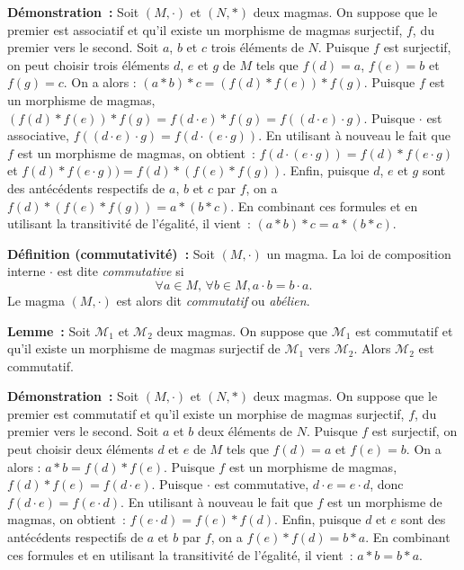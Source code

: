 \medskip

\noindent\textbf{Démonstration :} Soit $(M,\cdot)$ et $(N,\ast)$ deux magmas. 
    On suppose que le premier est associatif et qu'il existe un morphisme de magmas surjectif, $f$, du premier vers le second. 
    Soit $a$, $b$ et $c$ trois éléments de $N$. 
    Puisque $f$ est surjectif, on peut choisir trois éléments $d$, $e$ et $g$ de $M$ tels que $f(d) = a$, $f(e) = b$ et $f(g) = c$.
    On a alors : $(a \ast b) \ast c = (f(d) \ast f(e)) \ast f(g)$.
    Puisque $f$ est un morphisme de magmas, $(f(d) \ast f(e)) \ast f(g) = f(d \cdot e) \ast f(g) = f((d \cdot e) \cdot g)$.
    Puisque $\cdot$ est associative, $f((d \cdot e) \cdot g) = f(d \cdot (e \cdot g))$. 
    En utilisant à nouveau le fait que $f$ est un morphisme de magmas, on obtient : $f(d \cdot (e \cdot g)) = f(d) \ast f(e \cdot g)$ et $f(d) \ast f(e \cdot g)) = f(d) \ast (f(e) \ast f(g))$. 
    Enfin, puisque $d$, $e$ et $g$ sont des antécédents respectifs de $a$, $b$ et $c$ par $f$, on a $f(d) \ast (f(e) \ast f(g)) = a \ast (b \ast c)$. 
    En combinant ces formules et en utilisant la transitivité de l'égalité, il vient : $(a \ast b) \ast c = a \ast (b \ast c)$.

    \hfill \square

\medskip

\noindent\textbf{Définition (commutativité) :} Soit $(M,\cdot)$ un magma.
    La loi de composition interne $\cdot$ est dite \textit{commutative} si
    \begin{equation*}
        \forall a \in M, \, \forall b \in M,  
        a \cdot b = b \cdot a.
    \end{equation*}
    Le magma $(M, \cdot)$ est alors dit \textit{commutatif} ou \textit{abélien}.

\medskip

\noindent\textbf{Lemme :} Soit $\mathcal{M}_1$ et $\mathcal{M}_2$ deux magmas.
    On suppose que $\mathcal{M}_1$ est commutatif et qu'il existe un morphisme de magmas surjectif de $\mathcal{M}_1$ vers $\mathcal{M}_2$.
    Alors $\mathcal{M}_2$ est commutatif.

\medskip

\noindent\textbf{Démonstration :} Soit $(M,\cdot)$ et $(N,\ast)$ deux magmas. 
    On suppose que le premier est commutatif et qu'il existe un morphise de magmas surjectif, $f$, du premier vers le second. 
    Soit $a$ et $b$ deux éléments de $N$. 
    Puisque $f$ est surjectif, on peut choisir deux éléments $d$ et $e$ de $M$ tels que $f(d) = a$ et $f(e) = b$.
    On a alors : $a \ast b = f(d) \ast f(e)$.
    Puisque $f$ est un morphisme de magmas, $f(d) \ast f(e) = f(d \cdot e)$.
    Puisque $\cdot$ est commutative, $d \cdot e = e \cdot d$, donc $f(d \cdot e) = f(e \cdot d)$. 
    En utilisant à nouveau le fait que $f$ est un morphisme de magmas, on obtient : $f(e \cdot d) = f(e) \ast f(d)$. 
    Enfin, puisque $d$ et $e$ sont des antécédents respectifs de $a$ et $b$ par $f$, on a $f(e) \ast f(d) = b \ast a$. 
    En combinant ces formules et en utilisant la transitivité de l'égalité, il vient : $a \ast b = b \ast a$.

